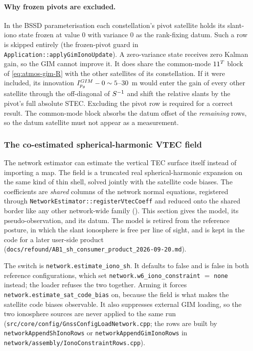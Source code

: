 \documentclass[main.tex]{subfiles}
\begin{document}
\paragraph{Why frozen pivots are excluded.}
In the BSSD parameterisation each constellation's pivot satellite holds
its slant-iono state frozen at value $0$ with variance $0$ as the
rank-fixing datum.  Such a row is skipped entirely
(the frozen-pivot guard in \texttt{Application::applyGimIonoUpdate}).  A
zero-variance state receives zero Kalman gain, so the GIM cannot improve
it.  It does share the common-mode $11^{T}$ block of
\eqref{eq:atmos-gim-R} with the other satellites of its constellation.
If it were included, its innovation
$I^{GIM}_{p_{g}} - 0 \sim 5$--$30$~m would enter the gain of
every other satellite through the off-diagonal of $S^{-1}$ and shift
the relative slants by the pivot's full absolute STEC.  Excluding the
pivot row is required for a correct result.  The common-mode block
absorbs the datum offset of the \emph{remaining} rows, so the datum
satellite must not appear as a measurement.

\subsubsection{The co-estimated spherical-harmonic VTEC field}\label{sec:atmos-shvtec}

The network estimator can estimate the vertical TEC surface itself instead
of importing a map.  The field is a truncated real spherical-harmonic
expansion on the same kind of thin shell, solved jointly with the
satellite code biases.  The coefficients are \emph{shared} columns of the
network normal equations, registered through
\texttt{NetworkEstimator::registerVtecCoeff} and reduced onto the shared
border like any other network-wide family ().  This section gives the model, its pseudo-observation,
and its datum.  The model is retired from the reference posture, in which
the slant ionosphere is free per line of sight, and is kept in the code
for a later user-side product
(\texttt{docs/refound/AB1\_sh\_consumer\_product\_2026-09-20.md}).

The switch is \texttt{network.estimate\_iono\_sh}.  It defaults to false
and is false in both reference configurations, which set
\texttt{network.w6\_iono\_constraint} $=$ \texttt{none} instead; the loader
refuses the two together.  Arming it forces
\texttt{network.estimate\_sat\_code\_bias} on, because the field is what
makes the satellite code biases observable.  It also suppresses external
GIM loading, so the two ionosphere sources are never applied to the same
run (\texttt{src/core/config/GnssConfigLoadNetwork.cpp}; the rows are
built by \texttt{networkAppendShIonoRows} or
\texttt{networkAppendGimIonoRows} in
\texttt{network/assembly/IonoConstraintRows.cpp}).
\end{document}
